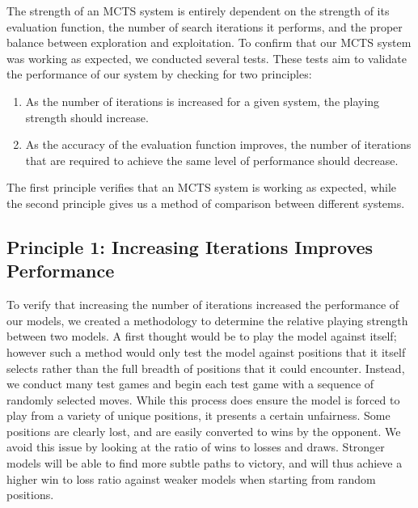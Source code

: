 \documentclass[10pt]{article}
\begin{document}
The strength of an MCTS system is entirely dependent on the strength of its evaluation function, the number of search iterations it performs, and the proper balance between exploration and exploitation. To confirm that our MCTS system was working as expected, we conducted several tests. These tests aim to validate the performance of our system by checking for two principles:

\begin{enumerate}
    \item As the number of iterations is increased for a given system, the playing strength should increase.
    \item As the accuracy of the evaluation function improves, the number of iterations that are required to achieve the same level of performance should decrease.
\end{enumerate}

The first principle verifies that an MCTS system is working as expected, while the second principle gives us a method of comparison between different systems.

\subsection{Principle 1: Increasing Iterations Improves Performance}
\label{sec:moreitersisbetter}

To verify that increasing the number of iterations increased the performance of our models, we created a methodology to determine the relative playing strength between two models. A first thought would be to play the model against itself; however such a method would only test the model against positions that it itself selects rather than the full breadth of positions that it could encounter. Instead, we conduct many test games and begin each test game with a sequence of randomly selected moves. While this process does ensure the model is forced to play from a variety of unique positions, it presents a certain unfairness. Some positions are clearly lost, and are easily converted to wins by the opponent. We avoid this issue by looking at the ratio of wins to losses and draws. Stronger models will be able to find more subtle paths to victory, and will thus achieve a higher win to loss ratio against weaker models when starting from random positions.
\end{document}
